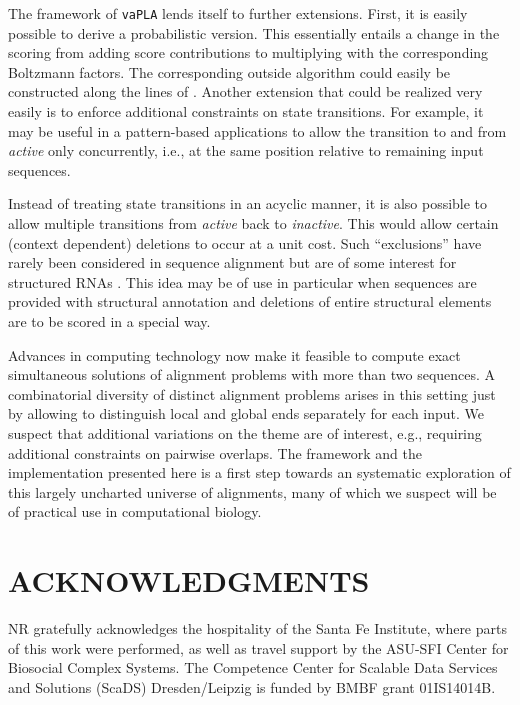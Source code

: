 \documentclass[a4paper,10pt]{article}
\let\cite\citep
\newcommand{\TODO}[1]{\begingroup\color{red}#1\endgroup}
\newcommand{\SAFTWARE}{\texttt{vaPLA}} %
\begin{document}
The framework of \SAFTWARE{} lends itself to further extensions. First, it
is easily possible to derive a probabilistic version. This essentially
entails a change in the scoring from adding score contributions to
multiplying with the corresponding Boltzmann factors. The corresponding
outside algorithm could easily be constructed along the lines of
\citet{Hoener:15b}. Another extension that could be realized very easily is
to enforce additional constraints on state transitions. For example, it may
be useful in a pattern-based applications to allow the transition to and
from \textit{active} only concurrently, i.e., at the same position relative
to remaining input sequences.

Instead of treating state transitions in an acyclic manner, it is also
possible to allow multiple transitions from \textit{active} back to
\textit{inactive}. This would allow certain (context dependent) deletions
to occur at a unit cost. Such ``exclusions'' have rarely been considered in
sequence alignment but are of some interest for structured RNAs
\cite{Schirmer:13}. This idea may be of use in particular when sequences
are provided with structural annotation and deletions of entire structural
elements are to be scored in a special way.

Advances in computing technology now make it feasible to compute exact
simultaneous solutions of alignment problems with more than two
sequences. A combinatorial diversity of distinct alignment problems arises
in this setting just by allowing to distinguish local and global ends
separately for each input. We suspect that additional variations on the
theme are of interest, e.g., requiring additional constraints on pairwise
overlaps. The framework and the implementation presented here is a first
step towards an systematic exploration of this largely uncharted universe
of alignments, many of which we suspect will be of practical use in
computational biology.

\section*{\uppercase{Acknowledgments}}

NR gratefully acknowledges the hospitality of the Santa Fe Institute, where
parts of this work were performed, as well as travel support by the ASU-SFI
Center for Biosocial Complex Systems. The Competence Center for Scalable
Data Services and Solutions (ScaDS) Dresden/Leipzig is funded by BMBF grant
01IS14014B.


{\small
}

\vfill
\end{document}
